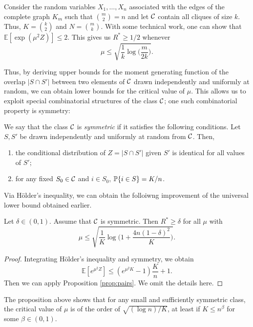 \documentclass[10pt, oneside]{article}
\begin{document}
\begin{exmp}
  Consider the random variables $X_1,\ldots,X_n$ associated with the edges of the complete graph $K_m$ such that ${m\choose2}=n$ and let ${\mathcal C}$ contain all cliques of size $k$. Thus, $K={k\choose2}$ and $N={m\choose k}$. With some technical work, one can show that $\mathbb{E}[ \exp(\mu^2Z) ] \le2$. This gives us $R^* \ge1/2$ whenever
%
\[
\mu\le\sqrt{\frac{1}{k} \log\biggl(\frac{m}{2k} \biggr)}.
\]

\end{exmp}

Thus, by deriving upper bounds for the moment generating function of the overlap $|S\cap S'|$ between two elements of ${\mathcal C}$ drawn independently and uniformly at random, we can obtain lower bounds for the critical value of $\mu$. This allows us to exploit special combinatorial structures of the class ${\mathcal C}$; one such combinatorial property is symmetry:
\begin{defn}
  We say that the class ${\mathcal C}$ is {\it symmetric} if it satisfies the following conditions.
  Let $S,S'$ be drawn independently and uniformly at random from ${\mathcal C}$. Then,
  \begin{enumerate}
    \item the conditional distribution of $Z=|S\cap S'|$ given $S'$ is identical
    for all values of $S'$;
    \item for any fixed $S_0\in{\mathcal C}$ and $i\in S_0$, $\mathbb{P}\{i\in S\}=K/n$.
  \end{enumerate}
\end{defn}
Via H\"older's inequality, we can obtain the folloiwng improvement of the universal lower bound obtained earlier.
\begin{prop}
  \label{symmetric}
  Let $\delta\in(0,1)$.
  Assume that ${\mathcal C}$ is symmetric. Then $R^*\ge\delta$ for all $\mu$ with
  \[
  \mu\le\sqrt{\frac{1}{K}\log\biggl(1+\frac{4n(1-\delta)^2}{K} \biggr)}.
  \]
\end{prop}
\begin{proof}
  Integrating H\"older's inequality and symmetry, we obtain 
  $$\mathbb{E}[ e^{\mu^2 Z}]\le (e^{\mu^2K} -1 ) \frac{K}{n} +1.$$
  Then we can apply Proposition \ref{prop:pairs}. We omit the details here.
\end{proof}
The proposition above shows that for any small and sufficiently symmetric
class, the critical value of $\mu$ is of the order of
$\sqrt{(\log n)/K}$, at least if $K\le n^\beta$ for some $\beta\in(0,1)$.
\end{document}
